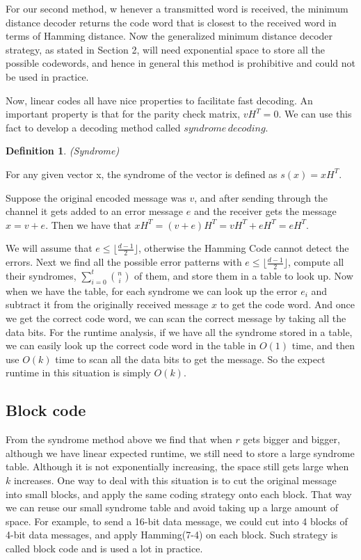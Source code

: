 \documentclass{article}
\newtheorem{Definition}{Definition}
\begin{document}
For our second method, w henever a transmitted word is received, the minimum distance decoder returns the code word that is closest to the received word in terms of Hamming distance. Now the generalized minimum distance decoder strategy, as stated in Section 2, will need exponential space to store all the possible codewords, and hence in general this method is prohibitive and could not be used in practice.

Now, linear codes all have nice properties to facilitate fast decoding. An important property is that for the parity check matrix,  $vH^T = 0$. We can use this fact to develop a decoding method called $syndrome\, decoding$.\\
\begin{Definition}(Syndrome)\end{Definition}
\noindent For any given vector x, the syndrome of the vector is defined as $s(x) = xH^T$.

Suppose the original encoded message was $v$, and after sending through the channel it gets added to an error message $e$ and the receiver gets the message $x = v+e$. Then we have that $xH^T = (v+e)H^T = vH^T+eH^T = eH^T$. 

We will assume that $e \leq \lfloor \frac{d - 1}{2} \rfloor$, otherwise the Hamming Code cannot detect the errors. Next we find all the possible error patterns with $e \leq \lfloor \frac{d - 1}{2} \rfloor$, compute all their syndromes, $ \sum_{i=0}^{t}{n \choose i} $ of them, and store them in a table to look up. Now when we have the table, for each syndrome we can look up the error $e_i$ and subtract it from the originally received message $x$ to get the code word. And once we get the correct code word, we can scan the correct message by taking all the data bits. For the runtime analysis, if we have all the syndrome stored in a table, we can easily look up the correct code word in the table in $O(1)$ time, and then use $O(k)$ time to scan all the data bits to get the message. So the expect runtime in this situation is simply $O(k)$.\\
\subsection{Block code}
From the syndrome method above we find that when $r$ gets bigger and bigger, although we have linear expected runtime, we still need to store a large syndrome table. Although it is not exponentially increasing, the space still gets large when $k$ increases. One way to deal with this situation is to cut the original message into small blocks, and apply the same coding strategy onto each block. That way we can reuse our small syndrome table and avoid taking up a large amount of space. For example, to send a 16-bit data message, we could cut into 4 blocks of 4-bit data messages, and apply  Hamming(7-4) on each block. Such strategy is called block code and is used a lot in practice.
\end{document}
